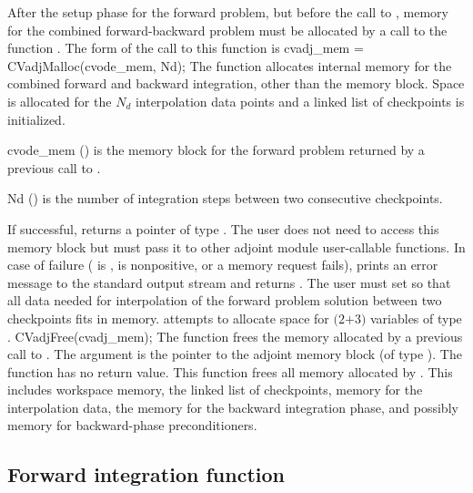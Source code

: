 After the setup phase for the forward problem, but before the call
to , memory for the combined forward-backward problem must be
allocated by a call to the function .
The form of the call to this function is
{
  cvadj\_mem = CVadjMalloc(cvode\_mem, Nd);
}
{
  The function  allocates internal memory for the combined
  forward and backward integration, other than the {\cvodes} memory block. 
  Space is allocated for the $N_d$ interpolation data points and a linked 
  list of checkpoints is initialized.
}
{
  \begin{args}
  \item[cvode\_mem] () 
    is the {\cvodes} memory block for the forward problem
    returned by a previous call to .
  \item[Nd] () 
    is the number of integration steps between two consecutive checkpoints.
  \end{args}
}
{
  If successful,  returns a pointer of type . The user
  does not need to access this memory block but must pass it to other adjoint module
  user-callable functions. In case of failure ( is ,  is
  nonpositive, or a memory request fails),  prints an error
  message to the standard output stream  and returns .
}
{
  The user must set  so that all data needed for interpolation of the 
  forward problem solution between two checkpoints fits in memory. 
  attempts to allocate space for $(2$$+3)$ variables of type .
}
{
  CVadjFree(cvadj\_mem);
}
{
  The function  frees the memory allocated by
  a previous call to .
}
{
  The argument is the pointer to the adjoint memory block (of type ).
}
{
  The function  has no return value.
}
{
  This function frees all memory allocated by . This includes workspace memory, 
  the linked list of checkpoints, memory for the interpolation data, the {\cvodes} memory 
  for the backward integration phase, and possibly memory for backward-phase preconditioners.
}


\subsection{Forward integration function}\label{sss:cvodef}

